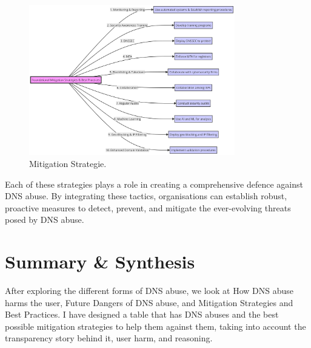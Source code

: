 \captionsetup{font= footnotesize}
\begin{figure} [H]
    \centering
   \includegraphics[width=0.8\textwidth]{background/diagram (7).png}
    \caption{Mitigation Strategie.}
    \label{sadasdasdada}
\end{figure}

Each of these strategies plays a role in creating a comprehensive defence against DNS abuse. By integrating these tactics, organisations can establish robust, proactive measures to detect, prevent, and mitigate the ever-evolving threats posed by DNS abuse.

\section{Summary \& Synthesis}

After exploring the different forms of DNS abuse, we look at How DNS abuse harms the user, Future Dangers of DNS abuse, and Mitigation Strategies and Best Practices. I have designed a table that has DNS abuses and the best possible mitigation strategies to help them against them, taking into account the transparency story behind it, user harm, and reasoning. 



